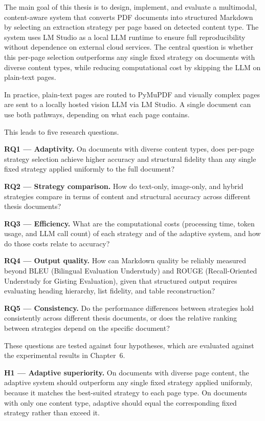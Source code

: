 The main goal of this thesis is to design, implement, and evaluate a multimodal,
content-aware system that converts PDF documents into structured Markdown by
selecting an extraction strategy per page based on detected content type. The
system uses LM Studio as a local LLM runtime to ensure full reproducibility
without dependence on external cloud services. The central question is whether
this per-page selection outperforms any single fixed strategy on documents with
diverse content types, while reducing computational cost by skipping the LLM on
plain-text pages.

In practice, plain-text pages are routed to PyMuPDF and visually complex pages
are sent to a locally hosted vision LLM via LM Studio. A single document can
use both pathways, depending on what each page contains.

This leads to five research questions.

\textbf{RQ1 --- Adaptivity.} On documents with diverse content types, does
per-page strategy selection achieve higher accuracy and structural fidelity
than any single fixed strategy applied uniformly to the full document?

\textbf{RQ2 --- Strategy comparison.} How do text-only, image-only, and hybrid
strategies compare in terms of content and structural accuracy across different
thesis documents?

\textbf{RQ3 --- Efficiency.} What are the computational costs (processing time,
token usage, and LLM call count) of each strategy and of the adaptive system,
and how do those costs relate to accuracy?

\textbf{RQ4 --- Output quality.} How can Markdown quality be reliably measured
beyond BLEU (Bilingual Evaluation Understudy) and ROUGE (Recall-Oriented
Understudy for Gisting Evaluation), given that structured output requires
evaluating heading
hierarchy, list fidelity, and table reconstruction?

\textbf{RQ5 --- Consistency.} Do the performance differences between strategies
hold consistently across different thesis documents, or does
the relative ranking between strategies depend on the specific document?

These questions are tested against four hypotheses, which are evaluated against
the experimental results in Chapter~6.

\textbf{H1 --- Adaptive superiority.} On documents with diverse page content,
the adaptive system should outperform any single fixed strategy applied
uniformly, because it matches the best-suited strategy to each page type.
On documents with only one content type, adaptive should equal the
corresponding fixed strategy rather than exceed it.

